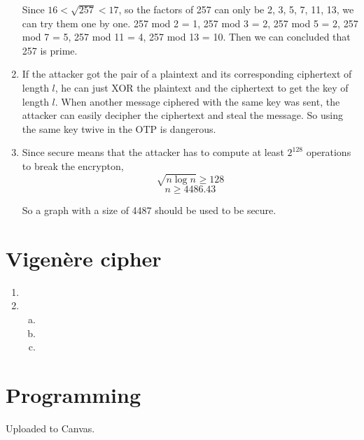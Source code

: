 \documentclass{article}
\begin{document}
\begin{enumerate}
Since $16<\sqrt{257}<17$, so the factors of 257 can only be 2, 3, 5, 7, 11, 13, we can try them one by one. 257 mod 2 = 1, 257 mod 3 = 2, 257 mod 5 = 2, 257 mod 7 = 5, 257 mod 11 = 4, 257 mod 13 = 10. Then we can concluded that 257 is prime.

\item
If the attacker got the pair of a plaintext and its corresponding ciphertext of length $l$, he can just XOR the plaintext and the ciphertext to get the key of length $l$. When another message ciphered with the same key was sent, the attacker can easily decipher the ciphertext and steal the message. So using the same key twive in the OTP is dangerous.

\item
Since secure means that the attacker has to compute at least $2^{128}$ operations to break the encrypton, $$\sqrt{n\log n}\geqslant 128$$
$$n\geqslant4486.43$$

So  a graph with a size of 4487 should be used to be secure.

\end{enumerate}

\section{Vigen\`ere cipher}
\begin{enumerate}
\item

\item
\begin{enumerate}[a)]
\item
\item
\item
\end{enumerate}
\end{enumerate}


\section{Programming}
Uploaded to Canvas.
\end{document}
